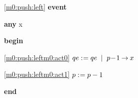 \noindent \ref{m0:push:left}  \textbf{event}
\begin{block}
  \item   \textbf{any} x
  \item   \textbf{begin}
  \begin{block}
  \item[ \eqref{m0:push:leftm0:act0} ]$qe \mathrel{:\mkern1mu=} qe \; \; | \; \; p\! - \!1 \mathbin\rightarrow x $ %
  \item[ \eqref{m0:push:leftm0:act1} ]$p \mathrel{:\mkern1mu=} p-1 $ %
  \end{block}
  \item   \textbf{end} \\
\end{block}
